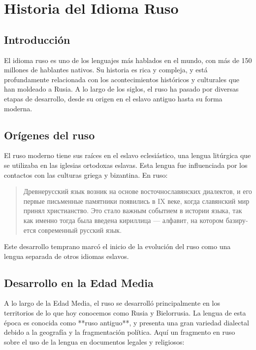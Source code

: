 \chapter{Historia del Idioma Ruso}

\section{Introducción}

El idioma ruso es uno de los lenguajes más hablados en el mundo, con más de 150 millones de hablantes nativos. Su historia es rica y compleja, y está profundamente relacionada con los acontecimientos históricos y culturales que han moldeado a Rusia. A lo largo de los siglos, el ruso ha pasado por diversas etapas de desarrollo, desde su origen en el eslavo antiguo hasta su forma moderna.

\section{Orígenes del ruso}

El ruso moderno tiene sus raíces en el eslavo eclesiástico, una lengua litúrgica que se utilizaba en las iglesias ortodoxas eslavas. Esta lengua fue influenciada por los contactos con las culturas griega y bizantina. En ruso:

\begin{quote}
\foreignlanguage{russian}{
Древнерусский язык возник на основе восточнославянских диалектов, и его первые письменные памятники появились в IX веке, когда славянский мир принял христианство. Это стало важным событием в истории языка, так как именно тогда была введена кириллица — алфавит, на котором базируется современный русский язык.}
\end{quote}

Este desarrollo temprano marcó el inicio de la evolución del ruso como una lengua separada de otros idiomas eslavos.

\section{Desarrollo en la Edad Media}

A lo largo de la Edad Media, el ruso se desarrolló principalmente en los territorios de lo que hoy conocemos como Rusia y Bielorrusia. La lengua de esta época es conocida como **ruso antiguo**, y presenta una gran variedad dialectal debido a la geografía y la fragmentación política. Aquí un fragmento en ruso sobre el uso de la lengua en documentos legales y religiosos:

